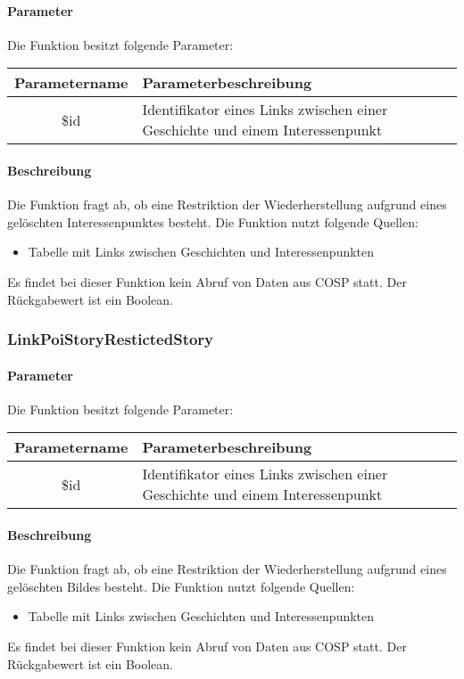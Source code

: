 \paragraph{Parameter} Die Funktion besitzt folgende Parameter:
\begin{table}[H]
	\begin{tabular}{|c|p{11cm}|}
		\hline
		\textbf{Parametername} & \textbf{Parameterbeschreibung} \\ \hline
		\$id    & Identifikator eines Links zwischen einer Geschichte und einem Interessenpunkt \\ \hline
	\end{tabular}
\end{table}
\paragraph{Beschreibung} Die Funktion fragt ab, ob eine Restriktion der Wiederherstellung aufgrund eines gelöschten Interessenpunktes besteht. Die Funktion nutzt folgende Quellen:
\begin{itemize}
	\item Tabelle mit Links zwischen Geschichten und Interessenpunkten
\end{itemize}
Es findet bei dieser Funktion kein Abruf von Daten aus {\glqq COSP\grqq} statt. Der Rückgabewert ist ein Boolean.
\subsubsection{LinkPoiStoryRestictedStory}
\paragraph{Parameter} Die Funktion besitzt folgende Parameter:
\begin{table}[H]
	\begin{tabular}{|c|p{11cm}|}
		\hline
		\textbf{Parametername} & \textbf{Parameterbeschreibung} \\ \hline
		\$id    & Identifikator eines Links zwischen einer Geschichte und einem Interessenpunkt \\ \hline
	\end{tabular}
\end{table}
\paragraph{Beschreibung} Die Funktion fragt ab, ob eine Restriktion der Wiederherstellung aufgrund eines gelöschten Bildes besteht. Die Funktion nutzt folgende Quellen:
\begin{itemize}
	\item Tabelle mit Links zwischen Geschichten und Interessenpunkten
\end{itemize}
Es findet bei dieser Funktion kein Abruf von Daten aus {\glqq COSP\grqq} statt. Der Rückgabewert ist ein Boolean.